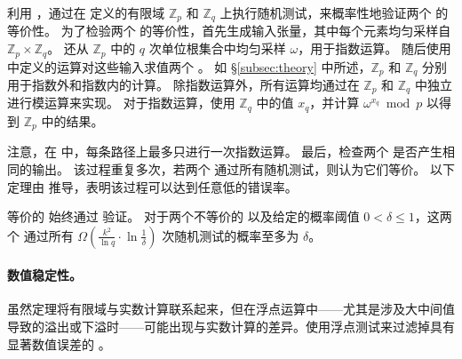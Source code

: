 \sys 利用 ，通过在  定义的有限域 $\mathbb{Z}_p$ 和 $\mathbb{Z}_q$ 上执行随机测试，来概率性地验证两个 \graphs 的等价性。
为了检验两个 \graphs 的等价性，\sys 首先生成输入张量，其中每个元素均匀采样自 $\mathbb{Z}_p \times \mathbb{Z}_q$。
\sys 还从 $\mathbb{Z}_p$ 中的 $q$ 次单位根集合中均匀采样 $\omega$，用于指数运算。
\sys 随后使用  中定义的运算对这些输入求值两个 \graphs。
如 \S\ref{subsec:theory} 中所述，$\mathbb{Z}_p$ 和 $\mathbb{Z}_q$ 分别用于指数外和指数内的计算。
除指数运算外，所有运算均通过在 $\mathbb{Z}_p$ 和 $\mathbb{Z}_q$ 中独立进行模运算来实现。
对于指数运算，\sys 使用 $\mathbb{Z}_q$ 中的值 $x_q$，并计算 $\omega^{x_q} \bmod p$ 以得到 $\mathbb{Z}_p$ 中的结果。

注意，在 \lax \graph 中，每条路径上最多只进行一次指数运算。
最后，\sys 检查两个 \graphs 是否产生相同的输出。
该过程重复多次，若两个 \graphs 通过所有随机测试，则认为它们等价。
以下定理由  推导，表明该过程可以达到任意低的错误率。

\begin{theorem}
\label{thm:prob}
等价的 \graphs 始终通过 \graph 验证。
对于两个不等价的 \graphs 以及给定的概率阈值 $0<\delta\leq 1$，这两个 \graphs 通过所有 $\Omega(\frac{k^2}{\ln q}\cdot \ln\frac{1}{\delta})$ 次随机测试的概率至多为 $\delta$。
\end{theorem}

\paragraph{数值稳定性。}虽然定理将有限域与实数计算联系起来，但在浮点运算中——尤其是涉及大中间值导致的溢出或下溢时——可能出现与实数计算的差异。\sys 使用浮点测试来过滤掉具有显著数值误差的 \graphs。
